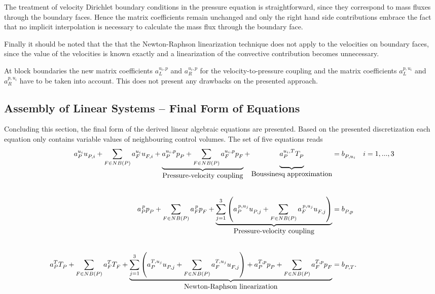 The treatment of velocity Dirichlet boundary conditions in the pressure equation is straightforward, since they correspond to mass fluxes through the boundary faces. Hence the matrix coefficients remain unchanged and only the right hand side contributions embrace the fact that no implicit interpolation is necessary to calculate the mass flux through the boundary face.

Finally it should be noted that the that the Newton-Raphson linearization technique does not apply to the velocities on boundary faces, since the value of the velocities is known exactly and a linearization of the convective contribution becomes unnecessary.


At block boundaries the new matrix coefficients \(a_L^{u_i,p}\) and \(a_R^{u_i,p}\) for the velocity-to-pressure coupling and the matrix coefficients \(a_L^{p,u_i}\) and \(a_R^{p,u_i}\) have to be taken into account. This does not present any drawbacks on the presented approach.

\subsection{Assembly of Linear Systems -- Final Form of Equations}

Concluding this section, the final form of the derived linear algebraic equations are presented. Based on the presented discretization each equation only contains variable values of neighbouring control volumes. The set of five equations reads
\begin{align}
  a_P^{u_i} u_{P,i}^{\vphantom{u_i}}
  + \sum_{F \in NB(P)} a_F^{u_i} u_{F,i}^{\vphantom{u_i}} 
  + \underbrace{\vphantom{\sum_F}{a_P^{u_i,p} p_P^{\vphantom{u_i,p}}
  + \sum_{F \in NB(P)} a_F^{u_i,p} p_F^{\vphantom{u_i,p}}}}_{\hbox{Pressure-velocity coupling}} 
  + \underbrace{\vphantom{\sum_F}{ a_P^{u_i,T} T_P^{\vphantom{u_i,T}}}}_{\hbox{Boussinesq approximation}} 
  &= b_{P,u_i}^{\vphantom{u_i,T}} \quad i=1,...,3  \\[2.0em]
  a_P^{\, p} p_{P}^{\vphantom{p}} 
  + \sum_{F \in NB(P)} a_F^{\,p} p_F^{\vphantom{\,p}} 
  + \underbrace{ \sum_{j=1}^3 \left(a_P^{\,p,u_j} u_{P,j}^{\vphantom{p,u_j}}
  + \sum_{F \in NB(P)} a_F^{\, p,u_j} u_{F,j}^{\vphantom{p,u_j}} \right)}_{\hbox{Pressure-velocity coupling}} 
  &= b_{P,p}^{\vphantom{p,u_j}}  \\[2.0em]
  a_P^{T} T_{P}^{\vphantom{T}} 
  + \sum_{F \in NB(P)} a_F^{T} T_F^{\vphantom{T}} 
  + \underbrace{\sum_{j=1}^3 \left(a_P^{T,u_j} u_{P,j}^{\vphantom{T,u_j}}
  + \sum_{F \in NB(P)} a_F^{T,u_j} u_{F,j}^{\vphantom{T,u_j}} \right) 
  + a_P^{T,p} p_P^{\vphantom{T,p}} 
+ \sum_{F \in NB(P) } a_F^{T,p} p_F^{\vphantom{T,p}}}_{\hbox{Newton-Raphson linearization}} 
  &= b_{P,T}^{\vphantom{T,p}}.
\end{align}

